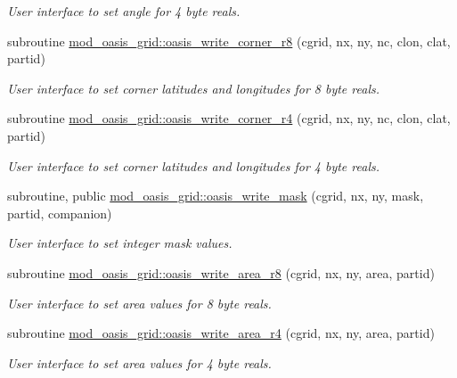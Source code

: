 \begin{DoxyCompactItemize}
\begin{DoxyCompactList}\small\item\em User interface to set angle for 4 byte reals. \end{DoxyCompactList}\item 
subroutine \hyperlink{namespacemod__oasis__grid_af6953999aa6fb1d0190187052bf52671}{mod\+\_\+oasis\+\_\+grid\+::oasis\+\_\+write\+\_\+corner\+\_\+r8} (cgrid, nx, ny, nc, clon, clat, partid)
\begin{DoxyCompactList}\small\item\em User interface to set corner latitudes and longitudes for 8 byte reals. \end{DoxyCompactList}\item 
subroutine \hyperlink{namespacemod__oasis__grid_a30e5d9c4766b2f323d4b930499e0f23b}{mod\+\_\+oasis\+\_\+grid\+::oasis\+\_\+write\+\_\+corner\+\_\+r4} (cgrid, nx, ny, nc, clon, clat, partid)
\begin{DoxyCompactList}\small\item\em User interface to set corner latitudes and longitudes for 4 byte reals. \end{DoxyCompactList}\item 
subroutine, public \hyperlink{namespacemod__oasis__grid_ae8c451c5d0190f1077107419283d2a6a}{mod\+\_\+oasis\+\_\+grid\+::oasis\+\_\+write\+\_\+mask} (cgrid, nx, ny, mask, partid, companion)
\begin{DoxyCompactList}\small\item\em User interface to set integer mask values. \end{DoxyCompactList}\item 
subroutine \hyperlink{namespacemod__oasis__grid_ae54eaec7b4e9d4877af0ce8537b0b256}{mod\+\_\+oasis\+\_\+grid\+::oasis\+\_\+write\+\_\+area\+\_\+r8} (cgrid, nx, ny, area, partid)
\begin{DoxyCompactList}\small\item\em User interface to set area values for 8 byte reals. \end{DoxyCompactList}\item 
subroutine \hyperlink{namespacemod__oasis__grid_ad1d3e95cf63a2277b82167ec6c8148d4}{mod\+\_\+oasis\+\_\+grid\+::oasis\+\_\+write\+\_\+area\+\_\+r4} (cgrid, nx, ny, area, partid)
\begin{DoxyCompactList}\small\item\em User interface to set area values for 4 byte reals. \end{DoxyCompactList}\item 

\end{DoxyCompactItemize}
